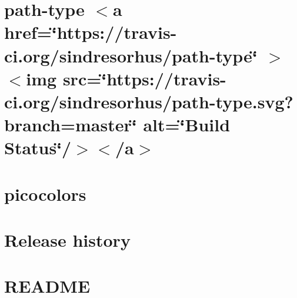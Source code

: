 \documentclass[twoside]{book}
\newcommand{\+}{\discretionary{\mbox{\scriptsize$\hookleftarrow$}}{}{}}
\begin{document}
\chapter{path-\/type \texorpdfstring{$<$}{<}a href=\char`\"{}https\+://travis-\/ci.\+org/sindresorhus/path-\/type\char`\"{} \texorpdfstring{$>$}{>}\texorpdfstring{$<$}{<}img src=\char`\"{}https\+://travis-\/ci.\+org/sindresorhus/path-\/type.\+svg?branch=master\char`\"{} alt=\char`\"{}\+Build Status\char`\"{}/\texorpdfstring{$>$}{>}\texorpdfstring{$<$}{<}/a\texorpdfstring{$>$}{>}}
\label{md__c___users_vaishnavi_jadhav__desktop__developer_code_mean_stack_example_client_node_modules_path_type_readme}

\chapter{picocolors}
\label{md__c___users_vaishnavi_jadhav__desktop__developer_code_mean_stack_example_client_node_modules_picocolors__r_e_a_d_m_e}

\chapter{Release history}
\label{md__c___users_vaishnavi_jadhav__desktop__developer_code_mean_stack_example_client_node_modules_picomatch__c_h_a_n_g_e_l_o_g}

\chapter{README}
\label{md__c___users_vaishnavi_jadhav__desktop__developer_code_mean_stack_example_client_node_modules_picomatch__r_e_a_d_m_e}

\end{document}
